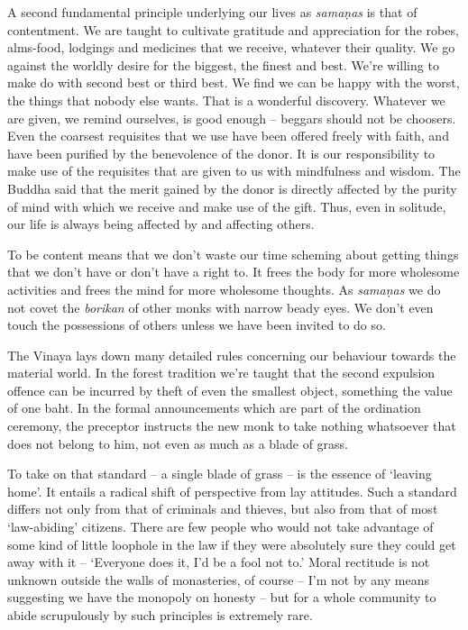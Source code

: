 A second fundamental principle underlying our lives as \emph{samaṇas} is
that of contentment. We are taught to cultivate gratitude and
appreciation for the robes, alms-food, lodgings and medicines that we
receive, whatever their quality. We go against the worldly desire for
the biggest, the finest and best. We're willing to make do with second
best or third best. We find we can be happy with the worst, the things
that nobody else wants. That is a wonderful discovery. Whatever we are
given, we remind ourselves, is good enough -- beggars should not be
choosers. Even the coarsest requisites that we use have been offered
freely with faith, and have been purified by the benevolence of the
donor. It is our responsibility to make use of the requisites that are
given to us with mindfulness and wisdom. The Buddha said that the merit
gained by the donor is directly affected by the purity of mind with which
we receive and make use of the gift. Thus, even in solitude, our life is
always being affected by and affecting others. 

To be content means that we don't waste our time scheming about getting
things that we don't have or don't have a right to. It frees the body
for more wholesome activities and frees the mind for more wholesome
thoughts. As \emph{samaṇas} we do not covet the \emph{borikan} of other
monks with narrow beady eyes. We don't even touch the possessions of
others unless we have been invited to do so. 

The Vinaya lays down many detailed rules concerning our behaviour
towards the material world. In the forest tradition we're taught that
the second expulsion offence can be incurred by theft of even the
smallest object, something the value of one baht.
In the formal announcements which are part of the ordination
ceremony, the preceptor instructs the new monk to take nothing
whatsoever that does not belong to him, not even as much as a blade of
grass. 

To take on that standard -- a single blade of grass -- is the essence
of `leaving home'. It entails a radical shift of perspective from lay
attitudes. Such a standard differs not only from that of criminals and
thieves, but also from that of most `law-abiding' citizens. There are
few people who would not take advantage of some kind of little loophole
in the law if they were absolutely sure they could get away with it --
`Everyone does it, I'd be a fool not to.' Moral rectitude is not unknown
outside the walls of monasteries, of course -- I'm not by any means
suggesting we have the monopoly on honesty -- but for a whole community
to abide scrupulously by such principles is extremely rare. 

